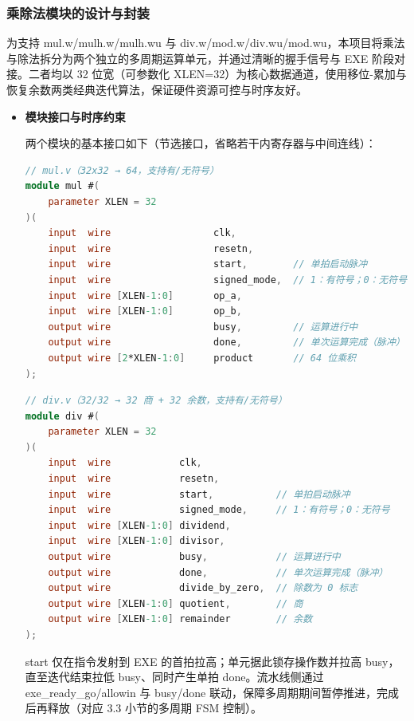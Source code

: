 \documentclass[11pt]{article}
\begin{document}
\subsubsection{乘除法模块的设计与封装}

为支持 mul.w/mulh.w/mulh.wu 与
div.w/mod.w/div.wu/mod.wu，本项目将乘法与除法拆分为两个独立的多周期运算单元，并通过清晰的握手信号与 EXE 阶段对接。二者均以 32 位宽（可参数化 XLEN=32）为核心数据通道，使用移位-累加与恢复余数两类经典迭代算法，保证硬件资源可控与时序友好。

\begin{itemize}

\item \textbf{模块接口与时序约束} 

两个模块的基本接口如下（节选接口，省略若干内寄存器与中间连线）：
    
\begin{lstlisting}[language=verilog]
// mul.v（32x32 → 64，支持有/无符号）
module mul #(
    parameter XLEN = 32
)(
    input  wire                  clk,
    input  wire                  resetn,
    input  wire                  start,        // 单拍启动脉冲
    input  wire                  signed_mode,  // 1：有符号；0：无符号
    input  wire [XLEN-1:0]       op_a,
    input  wire [XLEN-1:0]       op_b,
    output wire                  busy,         // 运算进行中
    output wire                  done,         // 单次运算完成（脉冲）
    output wire [2*XLEN-1:0]     product       // 64 位乘积
);
\end{lstlisting}
    
\begin{lstlisting}[language=verilog]
// div.v（32/32 → 32 商 + 32 余数，支持有/无符号）
module div #(
    parameter XLEN = 32
)(
    input  wire            clk,
    input  wire            resetn,
    input  wire            start,           // 单拍启动脉冲
    input  wire            signed_mode,     // 1：有符号；0：无符号
    input  wire [XLEN-1:0] dividend,
    input  wire [XLEN-1:0] divisor,
    output wire            busy,            // 运算进行中
    output wire            done,            // 单次运算完成（脉冲）
    output wire            divide_by_zero,  // 除数为 0 标志
    output wire [XLEN-1:0] quotient,        // 商
    output wire [XLEN-1:0] remainder        // 余数
);
\end{lstlisting}
    
start 仅在指令发射到 EXE 的首拍拉高；单元据此锁存操作数并拉高 busy，直至迭代结束拉低 busy、同时产生单拍 done。流水线侧通过 exe\_ready\_go/allowin 与 busy/done 联动，保障多周期期间暂停推进，完成后再释放（对应 3.3 小节的多周期 FSM 控制）。
    

\end{itemize}
\end{document}
